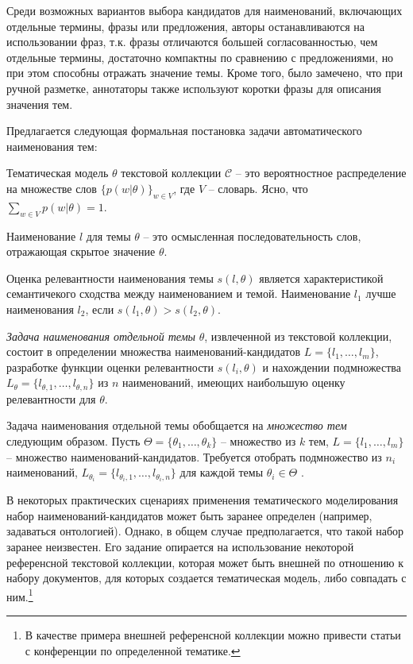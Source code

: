 Среди возможных вариантов выбора кандидатов для наименований, включающих отдельные термины, фразы или предложения, авторы останавливаются на использовании фраз, т.к. фразы отличаются большей согласованностью, чем отдельные термины, достаточно компактны по сравнению с предложениями, но при этом способны отражать значение темы. Кроме того, было замечено, что при ручной разметке, аннотаторы также используют коротки фразы для описания значения тем.

Предлагается следующая формальная постановка задачи автоматического наименования тем:

Тематическая модель $\theta$ текстовой коллекции $\mathcal{C}$ -- это вероятностное распределение на множестве слов $\{p(w|\theta)\}_{w \in V}$, где $V$ -- словарь. Ясно, что $\sum_{w \in V}p(w|\theta) = 1$.

Наименование $l$ для темы $\theta$ -- это осмысленная последовательность слов, отражающая скрытое значение $\theta$.

Оценка релевантности наименования темы $s(l, \theta)$ является характеристикой семантичекого сходства между наименованием и темой. Наименование $l_1$ лучше наименования $l_2$, если $s(l_1, \theta) > s(l_2, \theta)$.

\textit{Задача наименования отдельной темы} $\theta$, извлеченной из текстовой коллекции, состоит в определении множества наименований-кандидатов $L = \{l_1, \ldots, l_m\}$, разработке функции оценки релевантности $s(l_i, \theta)$ и нахождении подмножества $L_\theta = \{l_{\theta, 1}, \ldots, l_{\theta, n}\}$ из $n$ наименований, имеющих наибольшую оценку релевантности  для $\theta$.

Задача наименования отдельной темы обобщается на \textit{множество тем} следующим образом. Пусть $\Theta = \{\theta_1, \ldots, \theta_k\}$ -- множество из $k$ тем, $L = \{l_1, \ldots, l_m\}$ -- множество наименований-кандидатов. Требуется отобрать подмножество из $n_i$ наименований, $L_{\theta_i} = \{l_{\theta_i, 1}, \ldots, l_{\theta_i, n}\}$ для каждой темы $\theta_i \in \Theta$ .

В некоторых практических сценариях применения тематического моделирования набор наименований-кандидатов может быть заранее определен (например, задаваться онтологией). Однако, в общем случае предполагается, что такой набор заранее неизвестен. Его задание опирается на использование некоторой референсной текстовой коллекции, которая может быть внешней по отношению к набору документов, для которых создается тематическая модель, либо совпадать с ним.\footnote{В качестве примера внешней референсной коллекции можно привести статьи с конференции по определенной тематике.}

